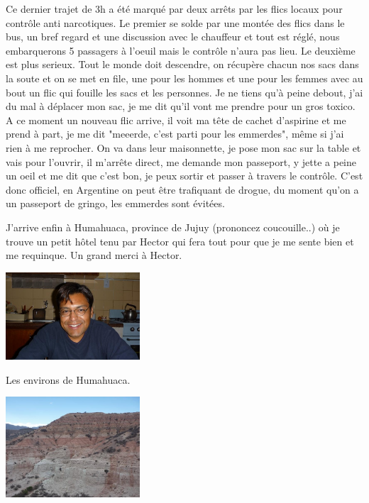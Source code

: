 \begin{multicols}{2}
Ce dernier trajet de 3h a été marqué par deux arrêts par les flics locaux pour contrôle anti narcotiques. Le premier se solde par une montée des flics dans le bus, un bref regard et une discussion avec le chauffeur et tout est réglé, nous embarquerons 5 passagers à l'oeuil mais le contrôle n'aura pas lieu. Le deuxième est plus serieux. Tout le monde doit descendre, on récupère chacun nos sacs dans la soute et on se met en file, une pour les hommes et une pour les femmes avec au bout un flic qui fouille les sacs et les personnes. Je ne tiens qu'à peine debout, j'ai du mal à déplacer mon sac, je me dit qu'il vont me prendre pour un gros toxico. A ce moment un nouveau flic arrive, il voit ma tête de cachet d'aspirine et me prend à part, je me dit "meeerde, c'est parti pour les emmerdes", même si j'ai rien à me reprocher. On va dans leur maisonnette, je pose mon sac sur la table et vais pour l'ouvrir, il m'arrête direct, me demande mon passeport, y jette a peine un oeil et me dit que c'est bon, je peux sortir et passer à travers le contrôle. C'est donc officiel, en Argentine on peut être trafiquant de drogue, du moment qu'on a un passeport de gringo, les emmerdes sont évitées.

J'arrive enfin à Humahuaca, province de Jujuy (prononcez coucouille..) où je trouve un petit hôtel tenu par Hector qui fera tout pour que je me sente bien et me requinque. Un grand merci à Hector.

\smallbreak
\hspace*{-0.65cm}
\includegraphics[width=5cm]{articles/La-paz-humahuaca-et-salaar/1257388208hISG.jpg}
\smallbreak

Les environs de Humahuaca.

\smallbreak
\hspace*{-0.65cm}
\includegraphics[width=5cm]{articles/La-paz-humahuaca-et-salaar/125738819811hb.jpg}
\smallbreak


\end{multicols}

